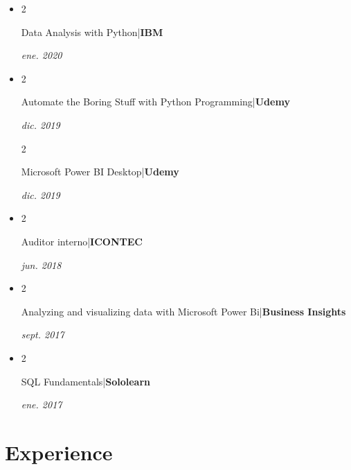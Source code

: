\documentclass[10pt, letterpaper]{article}
\newenvironment{highlights}{
    \begin{itemize}[
        topsep=0.10 cm,
        parsep=0.10 cm,
        partopsep=0pt,
        itemsep=0pt,
        leftmargin=0.4 cm + 10pt
    ]
}{
    \end{itemize}
} %
\newenvironment{twocolentry}[2][]{
    \onecolentry
    \def\secondColumn{#2}
    \setcolumnwidth{\fill, 4.5 cm}
    \begin{paracol}{2}
}{
    \switchcolumn \raggedleft \secondColumn
    \end{paracol}
    \endonecolentry
} %
\begin{document}
\begin{highlights}
        \item \begin{twocolentry}{
        \textit{ene. 2020}}
            Data Analysis with Python|\textbf{IBM}
        \end{twocolentry}
		
        \item \begin{twocolentry}{
        \textit{dic. 2019}}
            Automate the Boring Stuff with Python Programming|\textbf{Udemy}
        \end{twocolentry}
		
        \begin{twocolentry}{
        \textit{dic. 2019}}
            Microsoft Power BI Desktop|\textbf{Udemy}
        \end{twocolentry}
		
        \item \begin{twocolentry}{
        \textit{jun. 2018}}
            Auditor interno|\textbf{ICONTEC}
        \end{twocolentry}
		
        \item \begin{twocolentry}{
        \textit{sept. 2017}}
            Analyzing and visualizing data with Microsoft Power Bi|\textbf{Business Insights}
        \end{twocolentry}
		
        \item \begin{twocolentry}{
        \textit{ene. 2017}}
            SQL Fundamentals|\textbf{Sololearn}
        \end{twocolentry}

\end{highlights}


    
    \section{Experience}
\end{document}
